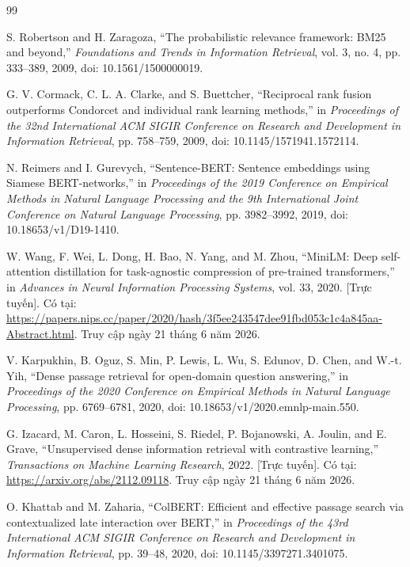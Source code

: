 \documentclass[../DoAn.tex]{subfiles}
\begin{document}
\renewcommand{\bibname}{TÀI LIỆU THAM KHẢO}

\begin{thebibliography}{99}

S. Robertson and H. Zaragoza,
``The probabilistic relevance framework: BM25 and beyond,''
\emph{Foundations and Trends in Information Retrieval},
vol. 3, no. 4, pp. 333--389, 2009,
doi: 10.1561/1500000019.

G. V. Cormack, C. L. A. Clarke, and S. Buettcher,
``Reciprocal rank fusion outperforms Condorcet and individual rank learning methods,''
in \emph{Proceedings of the 32nd International ACM SIGIR Conference on
Research and Development in Information Retrieval},
pp. 758--759, 2009,
doi: 10.1145/1571941.1572114.

N. Reimers and I. Gurevych,
``Sentence-BERT: Sentence embeddings using Siamese BERT-networks,''
in \emph{Proceedings of the 2019 Conference on Empirical Methods in Natural
Language Processing and the 9th International Joint Conference on Natural
Language Processing},
pp. 3982--3992, 2019,
doi: 10.18653/v1/D19-1410.

W. Wang, F. Wei, L. Dong, H. Bao, N. Yang, and M. Zhou,
``MiniLM: Deep self-attention distillation for task-agnostic compression of
pre-trained transformers,''
in \emph{Advances in Neural Information Processing Systems},
vol. 33, 2020. [Trực tuyến]. Có tại:
\url{https://papers.nips.cc/paper/2020/hash/3f5ee243547dee91fbd053c1c4a845aa-Abstract.html}.
Truy cập ngày 21 tháng 6 năm 2026.

V. Karpukhin, B. Oguz, S. Min, P. Lewis, L. Wu, S. Edunov, D. Chen,
and W.-t. Yih,
``Dense passage retrieval for open-domain question answering,''
in \emph{Proceedings of the 2020 Conference on Empirical Methods in Natural
Language Processing},
pp. 6769--6781, 2020,
doi: 10.18653/v1/2020.emnlp-main.550.

G. Izacard, M. Caron, L. Hosseini, S. Riedel, P. Bojanowski, A. Joulin,
and E. Grave,
``Unsupervised dense information retrieval with contrastive learning,''
\emph{Transactions on Machine Learning Research}, 2022. [Trực tuyến]. Có tại:
\url{https://arxiv.org/abs/2112.09118}.
Truy cập ngày 21 tháng 6 năm 2026.

O. Khattab and M. Zaharia,
``ColBERT: Efficient and effective passage search via contextualized late
interaction over BERT,''
in \emph{Proceedings of the 43rd International ACM SIGIR Conference on
Research and Development in Information Retrieval},
pp. 39--48, 2020,
doi: 10.1145/3397271.3401075.


\end{thebibliography}
\end{document}

